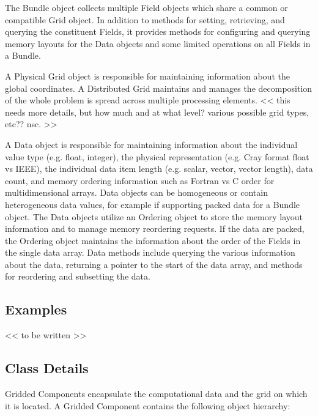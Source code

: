 The Bundle object collects multiple Field objects which share a
common or compatible Grid object.  In addition to methods for
setting, retrieving, and querying the constituent Fields, it provides
methods for configuring and querying memory layouts for the Data objects
and some limited operations on all Fields in a Bundle.

A Physical Grid object is responsible for
maintaining information about the global coordinates.
A Distributed Grid maintains and manages
the decomposition of the whole problem is spread across multiple
processing elements.  << this needs more details, but how
much and at what level?  various possible grid types, etc?? nsc. >> 

A Data object is responsible for maintaining
information about the individual value type (e.g. float, integer), 
the physical representation (e.g. Cray format float vs IEEE), the 
individual data item length (e.g. scalar, vector, vector length), 
data count, and memory ordering information such as Fortran vs C order 
for multidimensional arrays.  Data objects can be homogeneous or
contain heterogeneous data values, for example if supporting
packed data for a Bundle object.
The Data objects utilize an Ordering object to store the
memory layout information and to manage memory reordering requests.
If the data are packed, the Ordering object maintains the information
about the order of the Fields in the single data array.
Data methods include querying the various information about the
data, returning a pointer to the start of the data
array, and methods for reordering and subsetting the data.


\subsection{Examples}

<< to be written >>

\subsection{Class Details}

Gridded Components encapsulate the computational data and the
grid on which it is located.  A Gridded Component contains
the following object hierarchy:

